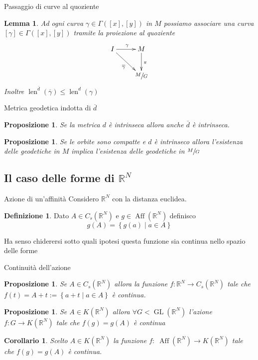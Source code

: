 \documentclass{beamer}
\newcounter{counter1}
\theoremstyle{plain}
\newtheorem{mylem}[counter1]{Lemma}
\newtheorem{mypro}[counter1]{Proposizione}
\newtheorem{mycor}[counter1]{Corollario}
\theoremstyle{definition}
\newtheorem{mydef}[counter1]{Definizione}
\theoremstyle{remark}
\newcommand{\obar}[1]{\overline{#1}}
\newcommand{\set}[1]{\left\{#1\right\}}
\newcommand{\pa}[1]{\left(#1\right)}
\newcommand{\bra}[1]{\left[#1\right]}
\DeclareMathOperator{\len}{len}
\DeclareMathOperator{\gl}{GL}
\DeclareMathOperator{\aff}{Aff}
\begin{document}
\begin{frame}{Passaggio di curve al quoziente}
  \begin{mylem}
    Ad ogni curva $\gamma \in \Gamma ( \bra{x}, \bra{y} )$ in $M$
    possiamo associare una curva $\bra{\gamma} \in \Gamma( \bra{x},
    \bra{y})$ tramite la proiezione al quoziente
    \[ 
    \xymatrix{I \ar[r]^\gamma \ar[dr] _{\obar \gamma}& M \ar[d]^\pi \\
      & \sfrac{M}{G}  
    }
    \]
    Inoltre $\len ^{\obar d} \pa{ \obar \gamma} \le \len ^d \pa{\gamma}$
  \end{mylem}
\end{frame}

\begin{frame}{Metrica geodetica indotta di $\obar d$}
  \begin{mypro}
    Se la metrica $d$ è intrinseca allora anche $\bar d$ è intrinseca.
  \end{mypro}
  \begin{mypro}
    Se le orbite sono compatte e $d$ è intrinseco allora l'esistenza
    delle geodetiche in $M$ implica l'esistenza delle geodetiche in
    $\sfrac{M}{G}$
  \end{mypro}
\end{frame}

\subsection{Il caso delle forme di $\mathbb{R}^N$}

\begin{frame}{Azione di un'affinità}
  Considero $\mathbb{R}^N$ con la distanza euclidea.
  \begin{mydef}
    Dato $A \in C_s(\mathbb{R}^N)$ e $g \in \aff (\mathbb{R}^N)$
    definisco
    \[ g(A) = \set{ g(a) \mid a \in A } \]
  \end{mydef}
  Ha senso chiderersi sotto quali ipotesi questa funzione sia continua
  nello spazio delle forme
\end{frame}

\begin{frame}{Continuità dell'azione}
  \begin{mypro}
    Se $A \in C_s(\mathbb{R}^N)$ allora la funzione $f: \mathbb{R}^N \to
    C_s(\mathbb{R}^N)$ tale che $f(t) = A + t := \set { a + t \mid a \in
      A}$ è continua.
  \end{mypro}
  \begin{mypro}
    Se $A \in K(\mathbb{R}^N)$ allora $\forall G < \gl (\mathbb{R}^N)$
    l'azione $f: G \rightarrow K(\mathbb{R}^N)$ tale che $f(g) = g(A)$
    è continua
  \end{mypro}
  \begin{mycor}
    Scelto $A \in K(\mathbb{R}^N)$ la funzione $f:\; \aff( \mathbb{R}^N)
    \to K(\mathbb{R}^N)$ tale che $f(g) = g(A)$ è continua.
  \end{mycor}
\end{frame}
\end{document}
